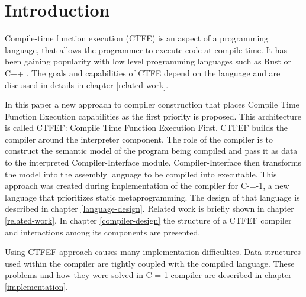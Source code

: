 \section{Introduction}


Compile-time function execution (CTFE) is an aspect of a programming language, that allows the programmer to execute code at compile-time. 
It has been gaining popularity with low level programming languages such as Rust \cite{rust} or C++ \cite{ISO:cpp98}.
The goals and capabilities of CTFE depend on the language and are discussed in details in chapter \ref{related-work}.

In this paper a new approach to compiler construction that places Compile Time Function Execution capabilities as the first priority is proposed. 
This architecture is called CTFEF: Compile Time Function Execution First. CTFEF builds the compiler around the interpreter component. 
The role of the compiler is to construct the semantic model of the program being compiled and pass it as data to the interpreted Compiler-Interface module. 
Compiler-Interface then transforms the model into the assembly language to be compiled into executable. 
This approach was created during implementation of the compiler for C-=-1, a new language that prioritizes static metaprogramming. 
The design of that language is described in chapter \ref{language-design}.
Related work is briefly shown in chapter \ref{related-work}.
In chapter \ref{compiler-design} the structure of a CTFEF compiler and interactions among its components are presented. 


Using CTFEF approach causes many implementation difficulties. Data structures used within the compiler are tightly coupled with the compiled language. 
These problems and how they were solved in C-=-1 compiler are described in chapter \ref{implementation}.